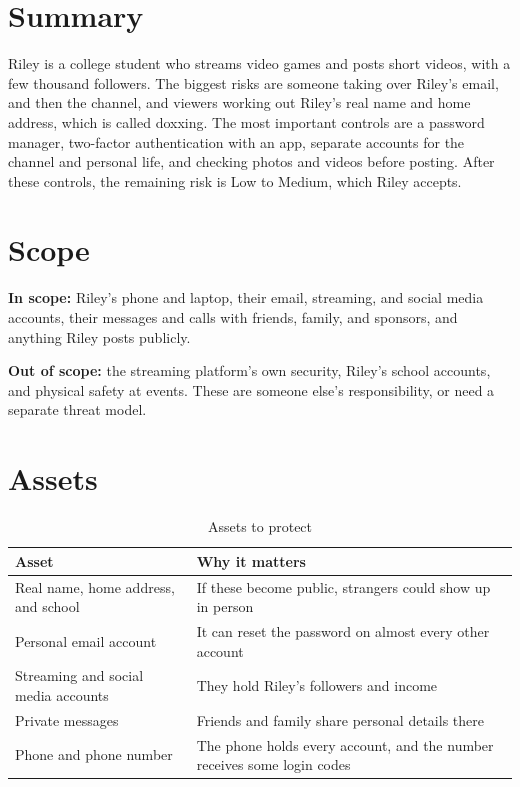 \documentclass[11pt]{article}
\begin{document}
\section{Summary}
Riley is a college student who streams video games and posts short videos, with a few thousand followers. The biggest risks are someone taking over Riley's email, and then the channel, and viewers working out Riley's real name and home address, which is called doxxing. The most important controls are a password manager, two-factor authentication with an app, separate accounts for the channel and personal life, and checking photos and videos before posting. After these controls, the remaining risk is Low to Medium, which Riley accepts.

\section{Scope}
\textbf{In scope:} Riley's phone and laptop, their email, streaming, and social media accounts, their messages and calls with friends, family, and sponsors, and anything Riley posts publicly.

\textbf{Out of scope:} the streaming platform's own security, Riley's school accounts, and physical safety at events. These are someone else's responsibility, or need a separate threat model.

\section{Assets}
\begin{table}[H]
\caption{Assets to protect}
\begin{tabular}{|m{}|m{}|}
\hline
\textbf{Asset} & \textbf{Why it matters} \\
\hline
Real name, home address, and school & If these become public, strangers could show up in person \\
\hline
Personal email account & It can reset the password on almost every other account \\
\hline
Streaming and social media accounts & They hold Riley's followers and income \\
\hline
Private messages & Friends and family share personal details there \\
\hline
Phone and phone number & The phone holds every account, and the number receives some login codes
\end{tabular}
\end{table}
\end{document}
